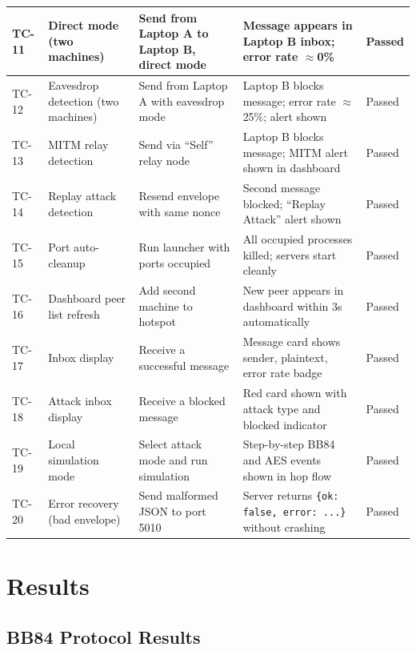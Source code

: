 \begin{longtable}{|p{1.2cm}|p{3.4cm}|p{4.0cm}|p{4.0cm}|p{1.8cm}|}
TC-11 & Direct mode (two machines) & Send from Laptop A to Laptop B, direct mode & Message appears in Laptop B inbox; error rate $\approx$0\% & Passed \\
\hline

TC-12 & Eavesdrop detection (two machines) & Send from Laptop A with eavesdrop mode & Laptop B blocks message; error rate $\approx$25\%; alert shown & Passed \\
\hline

TC-13 & MITM relay detection & Send via ``Self'' relay node & Laptop B blocks message; MITM alert shown in dashboard & Passed \\
\hline

TC-14 & Replay attack detection & Resend envelope with same nonce & Second message blocked; ``Replay Attack'' alert shown & Passed \\
\hline

TC-15 & Port auto-cleanup & Run launcher with ports occupied & All occupied processes killed; servers start cleanly & Passed \\
\hline

TC-16 & Dashboard peer list refresh & Add second machine to hotspot & New peer appears in dashboard within 3s automatically & Passed \\
\hline

TC-17 & Inbox display & Receive a successful message & Message card shows sender, plaintext, error rate badge & Passed \\
\hline

TC-18 & Attack inbox display & Receive a blocked message & Red card shown with attack type and blocked indicator & Passed \\
\hline

TC-19 & Local simulation mode & Select attack mode and run simulation & Step-by-step BB84 and AES events shown in hop flow & Passed \\
\hline

TC-20 & Error recovery (bad envelope) & Send malformed JSON to port 5010 & Server returns \texttt{\{ok: false, error: ...\}} without crashing & Passed \\
\hline
\end{longtable}

\section{Results}

\subsection{BB84 Protocol Results}


